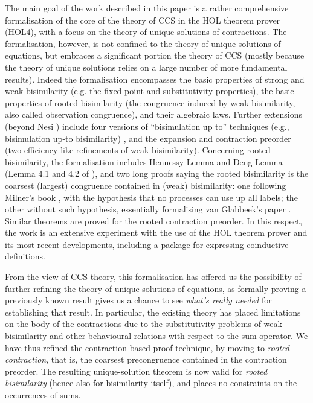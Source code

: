 The main goal of the work described in this paper is a rather
comprehensive formalisation of the core of the theory of CCS in the HOL
theorem prover (HOL4),  with a focus on the theory of unique solutions of contractions.
The formalisation, however, is not confined to the theory of unique
solutions of equations, but embraces a significant portion the theory of CCS \cite{Mil89}
(mostly because the theory of unique solutions relies on a large number of more fundamental results).
Indeed the formalisation encompasses the basic properties of strong and weak
bisimilarity (e.g. the fixed-point and substitutivity properties), the
basic properties of
rooted bisimilarity (the congruence induced by weak
bisimilarity, also called observation congruence), and
their algebraic laws. Further extensions (beyond Nesi
\cite{Nesi:1992ve}) include four versions of ``bisimulation up to''
techniques (e.g., bisimulation up-to bisimilarity) \cite{Mil89,sangiorgi1992problem}, and the
expansion and contraction preorder (two
efficiency-like refinements of weak bisimilarity). Concerning rooted bisimilarity, the formalisation
includes Hennessy Lemma and Deng Lemma (Lemma 4.1 and 4.2 of
\cite{Gorrieri:2015jt}),
 and two long proofs saying the rooted bisimilarity is the coarsest (largest)
 congruence contained in (weak) bisimilarity: one following Milner's
 book \cite{Mil89}, with the hypothesis that no processes can use up
 all labels;
the other without such hypothesis, essentially formalising van Glabbeek's paper \cite{van2005characterisation}.
Similar theorems are proved for the rooted contraction preorder.
In this respect, the work is an extensive experiment with the use of the HOL theorem prover and its
most recent developments, including a package for expressing coinductive definitions.

From the view of CCS theory, this formalisation has offered us the possibility of
further refining the theory of unique solutions of
equations, as formally proving a previously known result gives us a
chance to see \emph{what's really needed} for establishing that result.
In particular, the existing theory \cite{sangiorgi2017equations} has
placed limitations on the body of the contractions due to the
substitutivity problems of weak bisimilarity and other behavioural relations with respect
to the sum operator.
We have thus refined the contraction-based proof technique, by moving to  
\emph{rooted contraction}, that is, the coarsest precongruence contained in the contraction
preorder. The resulting unique-solution theorem is now valid for
\emph{rooted bisimilarity} (hence also for bisimilarity itself), and places no 
constraints on the occurrences of sums.

